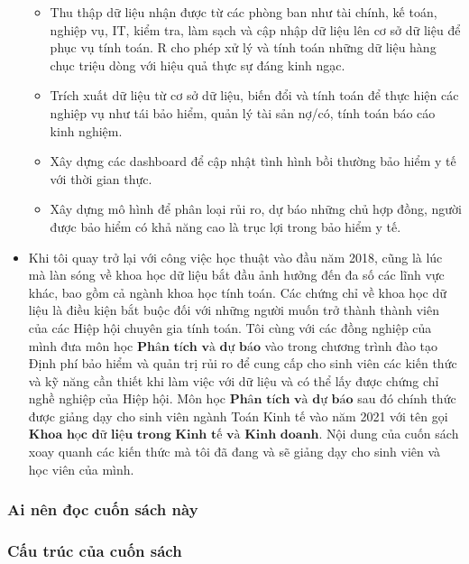 \documentclass[
]{article}
\begin{document}
\begin{itemize}
  \begin{itemize}
  \item
    Thu thập dữ liệu nhận được từ các phòng ban như tài chính, kế toán, nghiệp vụ, IT, kiểm tra, làm sạch và cập nhập dữ liệu lên cơ sở dữ liệu để phục vụ tính toán. R cho phép xử lý và tính toán những dữ liệu hàng chục triệu dòng với hiệu quả thực sự đáng kinh ngạc.
  \item
    Trích xuất dữ liệu từ cơ sở dữ liệu, biến đổi và tính toán để thực hiện các nghiệp vụ như tái bảo hiểm, quản lý tài sản nợ/có, tính toán báo cáo kinh nghiệm.
  \item
    Xây dựng các dashboard để cập nhật tình hình bồi thường bảo hiểm y tế với thời gian thực.
  \item
    Xây dựng mô hình để phân loại rủi ro, dự báo những chủ hợp đồng, người được bảo hiểm có khả năng cao là trục lợi trong bảo hiểm y tế.
  \end{itemize}
\item
  Khi tôi quay trở lại với công việc học thuật vào đầu năm 2018, cũng là lúc mà làn sóng về khoa học dữ liệu bắt đầu ảnh hưởng đến đa số các lĩnh vực khác, bao gồm cả ngành khoa học tính toán. Các chứng chỉ về khoa học dữ liệu là điều kiện bắt buộc đối với những người muốn trở thành thành viên của các Hiệp hội chuyên gia tính toán. Tôi cùng với các đồng nghiệp của mình đưa môn học \(\textbf{Phân tích và dự báo}\) vào trong chương trình đào tạo Định phí bảo hiểm và quản trị rủi ro để cung cấp cho sinh viên các kiến thức và kỹ năng cần thiết khi làm việc với dữ liệu và có thể lấy được chứng chỉ nghề nghiệp của Hiệp hội. Môn học \(\textbf{Phân tích và dự báo}\) sau đó chính thức được giảng dạy cho sinh viên ngành Toán Kinh tế vào năm 2021 với tên gọi \(\textbf{Khoa học dữ liệu trong Kinh tế và Kinh doanh}\). Nội dung của cuốn sách xoay quanh các kiến thức mà tôi đã đang và sẽ giảng dạy cho sinh viên và học viên của mình.
\end{itemize}

\hypertarget{ai-nuxean-ux111ux1ecdc-cuux1ed1n-suxe1ch-nuxe0y}{%
\subsubsection{Ai nên đọc cuốn sách này}\label{ai-nuxean-ux111ux1ecdc-cuux1ed1n-suxe1ch-nuxe0y}}

\hypertarget{cux1ea5u-truxfac-cux1ee7a-cuux1ed1n-suxe1ch}{%
\subsubsection{Cấu trúc của cuốn sách}\label{cux1ea5u-truxfac-cux1ee7a-cuux1ed1n-suxe1ch}}
\end{document}
